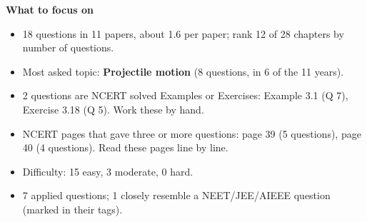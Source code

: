 \begin{minipage}[t]{0.63\linewidth}{\small\textbf{\color{crimson}What to focus on}\par\smallskip
\begin{itemize}[leftmargin=1.1em,itemsep=1pt,topsep=0pt]
\item 18 questions in 11 papers, about 1.6 per paper; rank 12 of 28 chapters by number of questions.
\item Most asked topic: \textbf{Projectile motion} (8 questions, in 6 of the 11 years).
\item 2 questions are NCERT solved Examples or Exercises: Example 3.1 (Q 7), Exercise 3.18 (Q 5). Work these by hand.
\item NCERT pages that gave three or more questions: page 39 (5 questions), page 40 (4 questions). Read these pages line by line.
\item Difficulty: 15 easy, 3 moderate, 0 hard.
\item 7 applied questions; 1 closely resemble a NEET/JEE/AIEEE question (marked in their tags).
\end{itemize}}\end{minipage}\par
{}
